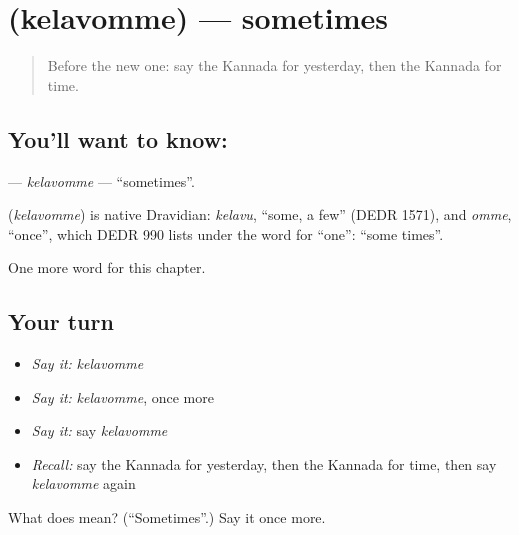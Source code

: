 \section[\texorpdfstring{\kn{ಕೆಲವೊಮ್ಮೆ} (kelavomme)}{ಕೆಲವೊಮ್ಮೆ (kelavomme)}]{ (kelavomme) — sometimes}

\label{lesson:KA-C284-kelavomme}



\begin{quote}
Before the new one: say the Kannada for yesterday, then the Kannada for time.
\end{quote}

\subsection*{You'll want to know: }
\textbf{} — \emph{kelavomme} — \textquotedblleft{}sometimes\textquotedblright{}.

\begin{cousinweb}
\textbf{} (\emph{kelavomme}) is native Dravidian: \emph{kelavu}, \textquotedblleft{}some, a few\textquotedblright{} (DEDR 1571), and \emph{omme}, \textquotedblleft{}once\textquotedblright{}, which DEDR 990 lists under the word for \textquotedblleft{}one\textquotedblright{}: \textquotedblleft{}some times\textquotedblright{}.
\end{cousinweb}

\begin{grammarlens}[title={What you've built}]
One more word for this chapter.
\end{grammarlens}

\subsection*{Your turn}
\begin{itemize}
\raggedright
  \item \emph{Say it:} \emph{kelavomme}
  \item \emph{Say it:} \emph{kelavomme}, once more
  \item \emph{Say it:} say \emph{kelavomme}
  \item \emph{Recall:} say the Kannada for yesterday, then the Kannada for time, then say \emph{kelavomme} again
\end{itemize}

\begin{tcolorbox}[breakable,colback=teal!4,colframe=teal!35!black,title={Before you move on}]
What does  mean? (\textquotedblleft{}Sometimes\textquotedblright{}.) Say it once more.
\end{tcolorbox}
